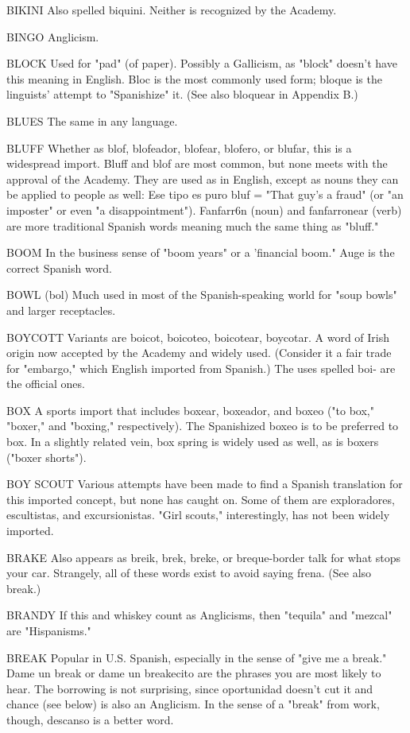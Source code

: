 BIKINI Also spelled biquini. Neither is recognized by the
Academy.

BINGO Anglicism.

BLOCK Used for "pad" (of paper). Possibly a Gallicism, as
"block" doesn't have this meaning in English. Bloc is the most commonly used form; bloque is the linguists' attempt to "Spanishize" it.
(See also bloquear in Appendix B.)

BLUES The same in any language.

BLUFF Whether as blof, blofeador, blofear, blofero, or blufar,
this is a widespread import. Bluff and blof are most common, but none
meets with the approval of the Academy. They are used as in English,
except as nouns they can be applied to people as well: Ese tipo es puro
bluf = "That guy's a fraud" (or "an imposter" or even "a disappointment"). Fanfarr6n (noun) and fanfarronear (verb) are more traditional
Spanish words meaning much the same thing as "bluff."

BOOM In the business sense of "boom years" or a 'financial
boom." Auge is the correct Spanish word.

BOWL (bol) Much used in most of the Spanish-speaking
world for "soup bowls" and larger receptacles.

BOYCOTT Variants are boicot, boicoteo, boicotear, boycotar.
A word of Irish origin now accepted by the Academy and widely used.
(Consider it a fair trade for "embargo," which English imported from
Spanish.) The uses spelled boi- are the official ones.

BOX A sports import that includes boxear, boxeador, and
boxeo ("to box," "boxer," and "boxing," respectively). The Spanishized
boxeo is to be preferred to box. In a slightly related vein, box spring is
widely used as well, as is boxers ("boxer shorts").

BOY SCOUT Various attempts have been made to find a Spanish translation for this imported concept, but none has caught on.
Some of them are exploradores, escultistas, and excursionistas. "Girl
scouts," interestingly, has not been widely imported.

BRAKE Also appears as breik, brek, breke, or breque-border talk for what stops your car. Strangely, all of these words exist to
avoid saying frena. (See also break.)

BRANDY If this and whiskey count as Anglicisms, then "tequila" and "mezcal" are "Hispanisms."

BREAK Popular in U.S. Spanish, especially in the sense of "give
me a break." Dame un break or dame un breakecito are the phrases
you are most likely to hear. The borrowing is not surprising, since
oportunidad doesn't cut it and chance (see below) is also an Anglicism.
In the sense of a "break" from work, though, descanso is a better word.

